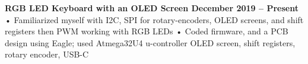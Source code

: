 \documentclass[../main.tex]{subfiles}
\begin{document}
\noindent\textbf{{\fontsize{\textFontSize}{\textFontBox}\selectfont RGB LED Keyboard with an OLED Screen \hfill December 2019 – Present}}
\vspace{-0mm}\newline
%
%
{\fontsize{\textFontSize}{\textFontBox}\selectfont • \hspace{1mm} Familiarized myself with I2C, SPI for rotary-encoders, OLED screens, and shift registers then PWM working with RGB LEDs }\newline
{\fontsize{\textFontSize}{\textFontBox}\selectfont • \hspace{1mm} Coded firmware, and a PCB design using Eagle; used Atmega32U4 u-controller OLED screen, shift registers, rotary encoder, USB-C}\vspace{1mm}\newline
%
%
\end{document}
